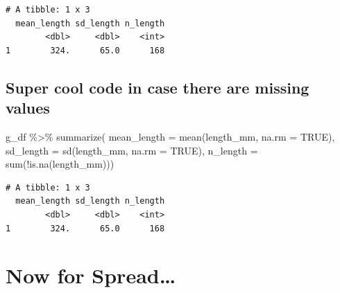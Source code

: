 \documentclass[
]{article}
\newenvironment{Shaded}{}{}
\newcommand{\AttributeTok}[1]{\textcolor[rgb]{0.84,0.23,0.29}{#1}}
\newcommand{\ConstantTok}[1]{\textcolor[rgb]{0.00,0.36,0.77}{#1}}
\newcommand{\FunctionTok}[1]{\textcolor[rgb]{0.44,0.26,0.76}{#1}}
\newcommand{\NormalTok}[1]{\textcolor[rgb]{0.14,0.16,0.18}{#1}}
\newcommand{\SpecialCharTok}[1]{\textcolor[rgb]{0.00,0.36,0.77}{#1}}
\begin{document}
\begin{verbatim}
# A tibble: 1 x 3
  mean_length sd_length n_length
        <dbl>     <dbl>    <int>
1        324.      65.0      168
\end{verbatim}

\subsection{Super cool code in case there are missing
values}\label{super-cool-code-in-case-there-are-missing-values}

\begin{Shaded}
\begin{Highlighting}[]
\NormalTok{g\_df }\SpecialCharTok{\%\textgreater{}\%} 
  \FunctionTok{summarize}\NormalTok{(}
    \AttributeTok{mean\_length =} \FunctionTok{mean}\NormalTok{(length\_mm, }\AttributeTok{na.rm =} \ConstantTok{TRUE}\NormalTok{),}
    \AttributeTok{sd\_length =} \FunctionTok{sd}\NormalTok{(length\_mm, }\AttributeTok{na.rm =} \ConstantTok{TRUE}\NormalTok{),}
    \AttributeTok{n\_length =} \FunctionTok{sum}\NormalTok{(}\SpecialCharTok{!}\FunctionTok{is.na}\NormalTok{(length\_mm)))}
\end{Highlighting}
\end{Shaded}

\begin{verbatim}
# A tibble: 1 x 3
  mean_length sd_length n_length
        <dbl>     <dbl>    <int>
1        324.      65.0      168
\end{verbatim}

\section{Now for Spread\ldots{}}\label{now-for-spread}
\end{document}
